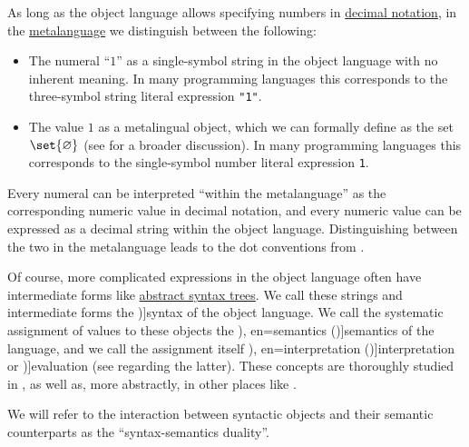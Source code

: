 \begin{concept}\label{con:syntax_semantics_duality}
  As long as the object language allows specifying numbers in \hyperref[def:positional_number_system/decimal]{decimal notation}, in the \hyperref[con:metalanguage]{metalanguage} we distinguish between the following:
  \begin{itemize}
    \item The numeral \enquote{\( 1 \)} as a single-symbol string in the object language with no inherent meaning. In many programming languages this corresponds to the three-symbol string literal expression \texttt{"1"}.

    \item The value \( 1 \) as a metalingual object, which we can formally define as the set \( \set{ \varnothing } \) (see  for a broader discussion). In many programming languages this corresponds to the single-symbol number literal expression \texttt{1}.
  \end{itemize}

  Every numeral can be interpreted \enquote{within the metalanguage} as the corresponding numeric value in decimal notation, and every numeric value can be expressed as a decimal string within the object language. Distinguishing between the two in the metalanguage leads to the dot conventions from .

  Of course, more complicated expressions in the object language often have intermediate forms like \hyperref[con:abstract_syntax_tree]{abstract syntax trees}. We call these strings and intermediate forms the \term[en=syntax (\cite[8]{Hinman2005Logic})]{syntax} of the object language. We call the systematic assignment of values to these objects the \term[ru=семантика (\cite[54]{КолмогоровДрагалин2006Логика}), en=semantics (\cite[8]{Hinman2005Logic})]{semantics} of the language, and we call the assignment itself \term[ru=интерпретация (\cite[17]{Герасимов2011Вычислимость}), en=interpretation (\cite[10]{Smullyan1995FOL})]{interpretation} or \term[ru=оценка (\cite[77]{ШеньВерещагин2017ЯзыкиИИсчисления})]{evaluation} (see  regarding the latter). These concepts are thoroughly studied in , as well as, more abstractly, in other places like .

  We will refer to the interaction between syntactic objects and their semantic counterparts as the \enquote{syntax-semantics duality}.
\end{concept}

